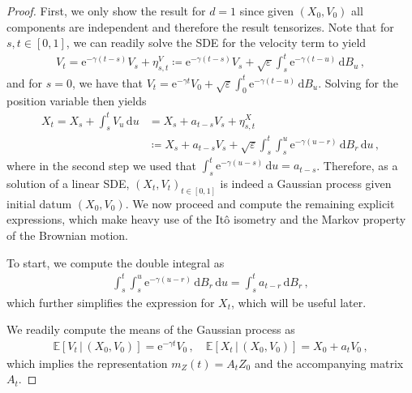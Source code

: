 \documentclass[10pt,a4paper]{amsart}
\newcommand*{\defeq}{\coloneqq}
\newcommand{\bbE}{\mathbb{E}}
\newcommand{\ccint}[1]{\left[#1\right]}
\newcommand{\dd}{\,\mathrm{d}}
\newcommand{\eps}{\varepsilon}
\newcommand{\rme}{\mathrm{e}}
\begin{document}
\begin{proof}
First, we only show the result for $d=1$ since given $(X_0,V_0)$ all components are independent and therefore the result tensorizes. Note that for $s,t \in \ccint{0,1}$, we can readily solve the SDE for the velocity term to yield
\begin{align*}
    V_t = \rme^{-\gamma(t-s)}V_s + \eta_{s,t}^V \defeq \rme^{-\gamma(t-s)}V_s + \sqrt{\eps}\int_s^t \rme^{-\gamma(t-u)}\dd B_u\,,
\end{align*}
and for $s=0$, we have that $V_t = \rme^{-\gamma t}V_0 + \sqrt{\eps}\int_0^t \rme^{-\gamma(t-u)} \dd B_u$. Solving for the position variable then yields
\begin{align*}
    X_t = X_s + \int_s^t V_u \dd u  &= X_s + a_{t-s}V_s + \eta_{s,t}^X\\
    &\defeq X_s + a_{t-s}V_s+ \sqrt{\varepsilon} \int_s^t \int_{s}^{u} \rme^{-\gamma(u - r)} \dd B_{r} \dd u\,,
\end{align*}
where in the second step we used that $\int_s^t \rme^{-\gamma(u-s)}\dd u = a_{t-s}$. Therefore, as a solution of a linear SDE, $(X_t,V_t)_{t\in \ccint{0,1}}$ is indeed a Gaussian process given initial datum $(X_0,V_0)$. We now proceed and compute the remaining explicit expressions, which make heavy use of the It\^o isometry and the Markov property of the Brownian motion.

To start, we compute the double integral as
\begin{align*}
  \int_s^t \int_s^u \rme^{-\gamma(u-r)} \dd B_r \dd u = \int_s^t a_{t-r}\dd B_r\,,
\end{align*}
which further simplifies the expression for $X_t$, which will be useful later.

We readily compute the means of the Gaussian process as
\begin{align*}
    \bbE[V_t\,|\,(X_0,V_0)] = \rme^{-\gamma t} V_0\,, \quad \bbE[X_t\,|\,(X_0,V_0)] = X_0 + a_tV_0\,,
\end{align*}
which implies the representation $m_Z(t) = A_t Z_0$ and the accompanying matrix $A_t$.


\end{proof}
\end{document}
